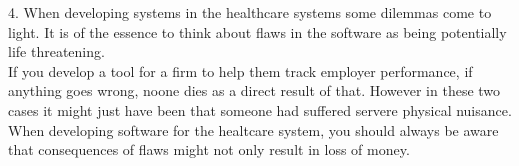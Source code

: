 4.
When developing systems in the healthcare systems some dilemmas come to light. It is of the essence to think about flaws in the software as being potentially life threatening.\\
If you develop a tool for a firm to help them track employer performance, if anything goes wrong, noone dies as a direct result of that.
However in these two cases it might just have been that someone had suffered servere physical nuisance.\\
When developing software for the healtcare system, you should always be aware that consequences of flaws might not only result in loss of money.
